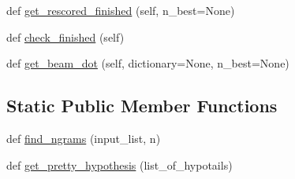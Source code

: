 \begin{DoxyCompactItemize}
\item 
def \hyperlink{classparlai_1_1agents_1_1legacy__agents_1_1seq2seq_1_1torch__agent__v1_1_1Beam_a3dbc095780f560a02bfafc0e0f646ebc}{get\+\_\+rescored\+\_\+finished} (self, n\+\_\+best=None)
\item 
def \hyperlink{classparlai_1_1agents_1_1legacy__agents_1_1seq2seq_1_1torch__agent__v1_1_1Beam_a6d43c0169b15e4d6a754a91a25137709}{check\+\_\+finished} (self)
\item 
def \hyperlink{classparlai_1_1agents_1_1legacy__agents_1_1seq2seq_1_1torch__agent__v1_1_1Beam_af4d7c9fd1fd93f59148fe7ab90c58da9}{get\+\_\+beam\+\_\+dot} (self, dictionary=None, n\+\_\+best=None)
\end{DoxyCompactItemize}
\subsection*{Static Public Member Functions}
\begin{DoxyCompactItemize}
\item 
def \hyperlink{classparlai_1_1agents_1_1legacy__agents_1_1seq2seq_1_1torch__agent__v1_1_1Beam_afb6aafacc0ad6d28539fe1406468ae66}{find\+\_\+ngrams} (input\+\_\+list, n)
\item 
def \hyperlink{classparlai_1_1agents_1_1legacy__agents_1_1seq2seq_1_1torch__agent__v1_1_1Beam_afb4e5fd2e6a13e7b64fa00d2336e5e14}{get\+\_\+pretty\+\_\+hypothesis} (list\+\_\+of\+\_\+hypotails)
\end{DoxyCompactItemize}
